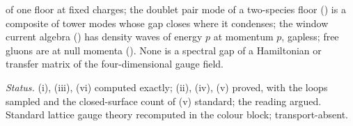 of one floor at fixed charges; the doublet pair mode of a two-species floor () is a composite of tower modes whose gap closes where it condenses; the window current algebra () has density waves of energy $p$ at momentum $p$, gapless; free gluons are at null momenta (). None is a spectral gap of a Hamiltonian or transfer matrix of the four-dimensional gauge field.

\emph{Status.} (i), (iii), (vi) computed exactly; (ii), (iv), (v) proved, with the loops sampled and the closed-surface count of (v) standard; the reading argued. Standard lattice gauge theory recomputed in the colour block; transport-absent.
